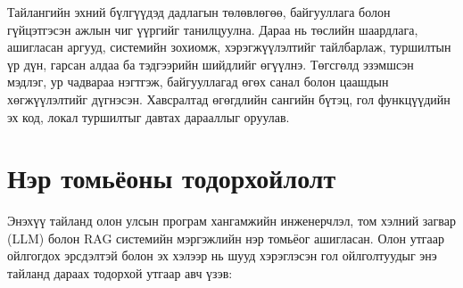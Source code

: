 \documentclass[../main.tex]{subfiles}
\begin{document}
Тайлангийн эхний бүлгүүдэд дадлагын төлөвлөгөө, байгууллага болон
гүйцэтгэсэн ажлын чиг үүргийг танилцуулна. Дараа нь төслийн шаардлага,
ашигласан аргууд, системийн зохиомж, хэрэгжүүлэлтийг тайлбарлаж,
туршилтын үр дүн, гарсан алдаа ба тэдгээрийн шийдлийг өгүүлнэ.
Төгсгөлд эзэмшсэн мэдлэг, ур чадвараа нэгтгэж, байгууллагад өгөх санал
болон цаашдын хөгжүүлэлтийг дүгнэсэн. Хавсралтад өгөгдлийн сангийн
бүтэц, гол функцүүдийн эх код, локал туршилтыг давтах дарааллыг оруулав.

\clearpage
\section*{Нэр томьёоны тодорхойлолт}

Энэхүү тайланд олон улсын програм хангамжийн инженерчлэл, том хэлний
загвар (LLM) болон RAG системийн мэргэжлийн нэр томьёог ашигласан.
Олон утгаар ойлгогдох эрсдэлтэй болон эх хэлээр нь шууд хэрэглэсэн
гол ойлголтуудыг энэ тайланд дараах тодорхой утгаар авч үзэв:
\end{document}
